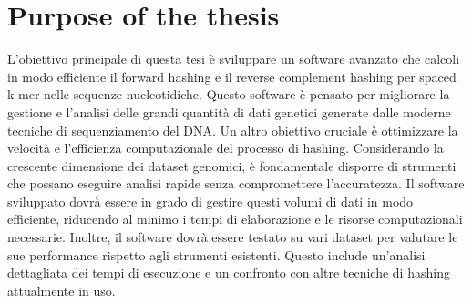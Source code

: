 \section{Purpose of the thesis}
\label{sec:thesis-purpose}

L'obiettivo principale di questa tesi è sviluppare un software avanzato che calcoli in modo efficiente il forward hashing e il reverse complement hashing per spaced k-mer nelle sequenze nucleotidiche. Questo software è pensato per migliorare la gestione e l'analisi delle grandi quantità di dati genetici generate dalle moderne tecniche di sequenziamento del DNA. Un altro obiettivo cruciale è ottimizzare la velocità e l'efficienza computazionale del processo di hashing. Considerando la crescente dimensione dei dataset genomici, è fondamentale disporre di strumenti che possano eseguire analisi rapide senza compromettere l'accuratezza. Il software sviluppato dovrà essere in grado di gestire questi volumi di dati in modo efficiente, riducendo al minimo i tempi di elaborazione e le risorse computazionali necessarie. Inoltre, il software dovrà essere testato su vari dataset per valutare le sue performance rispetto agli strumenti esistenti. Questo include un'analisi dettagliata dei tempi di esecuzione e un confronto con altre tecniche di hashing attualmente in uso.